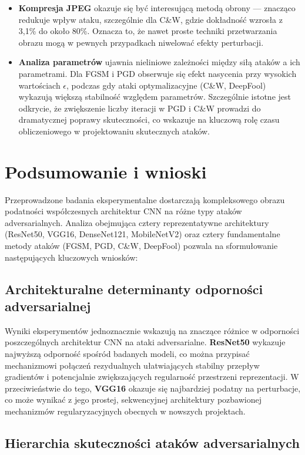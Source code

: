 \documentclass[12pt]{article}
\begin{document}
\begin{itemize}
    \item \textbf{Kompresja JPEG} okazuje się być interesującą metodą obrony — znacząco redukuje wpływ ataku, szczególnie dla C\&W, gdzie dokładność wzrosła z 3{,}1\% do około 80\%. Oznacza to, że nawet proste techniki przetwarzania obrazu mogą w pewnych przypadkach niwelować efekty perturbacji.
    
    \item \textbf{Analiza parametrów} ujawnia nieliniowe zależności między siłą ataków a ich parametrami. Dla FGSM i PGD obserwuje się efekt nasycenia przy wysokich wartościach $\epsilon$, podczas gdy ataki optymalizacyjne (C\&W, DeepFool) wykazują większą stabilność względem parametrów. Szczególnie istotne jest odkrycie, że zwiększenie liczby iteracji w PGD i C\&W prowadzi do dramatycznej poprawy skuteczności, co wskazuje na kluczową rolę czasu obliczeniowego w projektowaniu skutecznych ataków.
\end{itemize}

\section{Podsumowanie i wnioski}

Przeprowadzone badania eksperymentalne dostarczają kompleksowego obrazu podatności współczesnych architektur CNN na różne typy ataków adversarialnych. Analiza obejmująca cztery reprezentatywne architektury (ResNet50, VGG16, DenseNet121, MobileNetV2) oraz cztery fundamentalne metody ataków (FGSM, PGD, C\&W, DeepFool) pozwala na sformułowanie następujących kluczowych wniosków:

\subsection{Architekturalne determinanty odporności adversarialnej}

Wyniki eksperymentów jednoznacznie wskazują na znaczące różnice w odporności poszczególnych architektur CNN na ataki adversarialne. \textbf{ResNet50} wykazuje najwyższą odporność spośród badanych modeli, co można przypisać mechanizmowi połączeń rezydualnych ułatwiających stabilny przepływ gradientów i potencjalnie zwiększających regularność przestrzeni reprezentacji. W przeciwieństwie do tego, \textbf{VGG16} okazuje się najbardziej podatny na perturbacje, co może wynikać z jego prostej, sekwencyjnej architektury pozbawionej mechanizmów regularyzacyjnych obecnych w nowszych projektach.

\subsection{Hierarchia skuteczności ataków adversarialnych}
\end{document}
